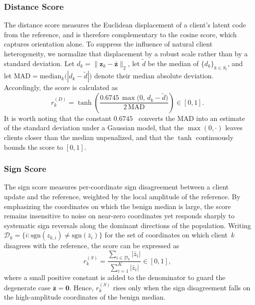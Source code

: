 \documentclass[journal]{IEEEtran}
\begin{document}
\subsubsection{Distance Score}
The distance score measures the Euclidean displacement of a client's latent code from the reference, and is therefore complementary to the cosine score, which captures orientation alone. To suppress the influence of natural client heterogeneity, we normalize that displacement by a robust scale rather than by a standard deviation. Let $d_k = \|\mathbf{z}_k - \bar{\mathbf{z}}\|_2$, let $\tilde{d}$ be the median of $\{d_k\}_{k \in S_t}$, and let $\mathrm{MAD} = \mathrm{median}_k\bigl(|d_k - \tilde{d}|\bigr)$ denote their median absolute deviation. Accordingly, the score is calculated as
\begin{equation}
r_k^{(D)} = \tanh\!\left(\frac{0.6745\,\max\bigl(0,\, d_k - \tilde{d}\bigr)}{2\,\mathrm{MAD}}\right) \in [0,1].
\label{eq:dist_score}
\end{equation}
It is worth noting that the constant $0.6745$~\cite{nist_modified_zscore} converts the MAD into an estimate of the standard deviation under a Gaussian model, that the $\max(0,\cdot)$ leaves clients closer than the median unpenalized, and that the $\tanh$ continuously bounds the score to $[0,1]$.

\subsubsection{Sign Score}
The sign score measures per-coordinate sign disagreement between a client update and the reference, weighted by the local amplitude of the reference. By emphasizing the coordinates on which the benign median is large, the score remains insensitive to noise on near-zero coordinates yet responds sharply to systematic sign reversals along the dominant directions of the population. Writing $\mathcal{D}_k = \bigl\{ i : \mathrm{sgn}(z_{k,i}) \neq \mathrm{sgn}(\bar z_i) \bigr\}$ for the set of coordinates on which client~$k$ disagrees with the reference, the score can be expressed as
\begin{equation}
r_k^{(S)} = \frac{\sum_{i \in \mathcal{D}_k} |\bar z_i|}{\sum_{i=1}^{K} |\bar z_i|} \in [0,1],
\label{eq:sign_score}
\end{equation}
where a small positive constant is added to the denominator to guard the degenerate case $\bar{\mathbf{z}} = \mathbf{0}$. Hence, $r_k^{(S)}$ rises only when the sign disagreement falls on the high-amplitude coordinates of the benign median.
\end{document}
